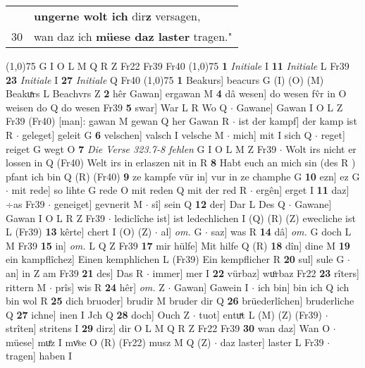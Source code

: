 \documentclass[8pt,a4paper,notitlepage]{article}
\begin{document}
\begin{table}[ht]
\begin{minipage}[t]{0.5\linewidth}
\begin{tabular}{rl}
 & \textbf{ungerne wolt ich} dir\textbf{z} versagen,\\ 
30 & wan daz ich \textbf{müese daz laster} tragen."\\ 
\end{tabular}
\scriptsize
\line(1,0){75} \newline
G I O L M Q R Z Fr22 Fr39 Fr40 \newline
\line(1,0){75} \newline
\textbf{1} \textit{Initiale} I  \textbf{11} \textit{Initiale} L Fr39  \textbf{23} \textit{Initiale} I  \textbf{27} \textit{Initiale} Q Fr40  \newline
\line(1,0){75} \newline
\textbf{1} Beakurs] beacurs G (I) (O) (M) Beakuͯrs L Beachvrs Z \textbf{2} hêr Gawan] ergawan M \textbf{4} dâ wesen] do wesen fv̂r in O weisen do Q do wesen Fr39 \textbf{5} swar] War L R Wo Q  $\cdot$ Gawane] Gawan I O L Z Fr39 (Fr40) [man]: gawan  M gewan Q her Gawan R  $\cdot$ ist der kampf] der kamp ist R  $\cdot$ geleget] geleit G \textbf{6} velschen] valsch I velsche M  $\cdot$ mich] mit I sich Q  $\cdot$ reget] reiget G wegt O \textbf{7} \textit{Die Verse 323.7-8 fehlen} G I O L M Z Fr39   $\cdot$ Wolt irs nicht er lossen in Q (Fr40) Welt irs in erlaszen nit in R \textbf{8} Habt euch an mich sin (des R ) pfant ich bin Q (R) (Fr40) \textbf{9} ze kampfe vür in] vur in ze champhe G \textbf{10} ezn] ez G  $\cdot$ mit rede] so lihte G rede O mit reden Q mit der red R  $\cdot$ ergên] erget I \textbf{11} daz] ÷as Fr39  $\cdot$ geneiget] gevnerit M  $\cdot$ sî] sein Q \textbf{12} der] Dar L Des Q  $\cdot$ Gawane] Gawan I O L R Z Fr39  $\cdot$ lediclîche ist] ist ledechlichen I (Q) (R) (Z) ewecliche ist L (Fr39) \textbf{13} kêrte] chert I (O) (Z)  $\cdot$ al] \textit{om.} G  $\cdot$ saz] was R \textbf{14} dâ] \textit{om.} G doch L M Fr39 \textbf{15} in] \textit{om.} L Q Z Fr39 \textbf{17} mir hülfe] Mit hilfe Q (R) \textbf{18} dîn] dine M \textbf{19} ein kampflîchez] Einen kemphlichen L (Fr39) Ein kempflicher R \textbf{20} sul] sule G  $\cdot$ an] in Z am Fr39 \textbf{21} des] Das R  $\cdot$ immer] mer I \textbf{22} vürbaz] wuͦrbaz Fr22 \textbf{23} rîters] rittern M  $\cdot$ prîs] wis R \textbf{24} hêr] \textit{om.} Z  $\cdot$ Gawan] Gawein I  $\cdot$ ich bin] bin ich Q ich bin wol R \textbf{25} dich bruoder] brudir M bruder dir Q \textbf{26} brüederlîchen] bruderliche Q \textbf{27} ichne] inen I Jch Q \textbf{28} doch] Ouch Z  $\cdot$ tuot] entuͯt L (M) (Z) (Fr39)  $\cdot$ strîten] stritens I \textbf{29} dirz] dir O L M Q R Z Fr22 Fr39 \textbf{30} wan daz] Wan O  $\cdot$ müese] muͤz I mvͦse O (R) (Fr22) musz M Q (Z)  $\cdot$ daz laster] laster L Fr39  $\cdot$ tragen] haben I \newline

\end{minipage}
\end{table}
\end{document}
